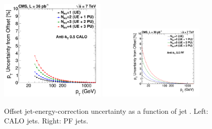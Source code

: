 \begin{figure}[ht!]
  \begin{center}
    \includegraphics[width=0.45\textwidth]{Figures/JEC/JECUncert_Offset_CALOAK5.pdf}
    \includegraphics[width=0.45\textwidth]{Figures/JEC/JECUncert_Offset_PFAK5.pdf}
    \caption{Offset jet-energy-correction uncertainty as a function of jet \pt. Left: CALO jets. Right: PF jets.}
    \label{fig:offsetUnc}
  \end{center}
\end{figure}

